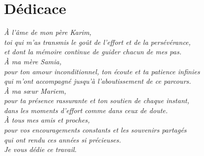 \chapter*{Dédicace}
\thispagestyle{empty}
\vspace*{2cm}
\begin{center}
\textit{À l'âme de mon père Karim,\\
toi qui m'as transmis le goût de l'effort et de la persévérance,\\
et dont la mémoire continue de guider chacun de mes pas.}\\[0.8cm]

\textit{À ma mère Samia,\\
pour ton amour inconditionnel, ton écoute et ta patience infinies\\
qui m'ont accompagné jusqu'à l'aboutissement de ce parcours.}\\[0.8cm]

\textit{À ma sœur Mariem,\\
pour ta présence rassurante et ton soutien de chaque instant,\\
dans les moments d'effort comme dans ceux de doute.}\\[0.8cm]

\textit{À tous mes amis et proches,\\
pour vos encouragements constants et les souvenirs partagés\\
qui ont rendu ces années si précieuses.}\\[1cm]

\textit{Je vous dédie ce travail.}
\end{center}
\clearpage
